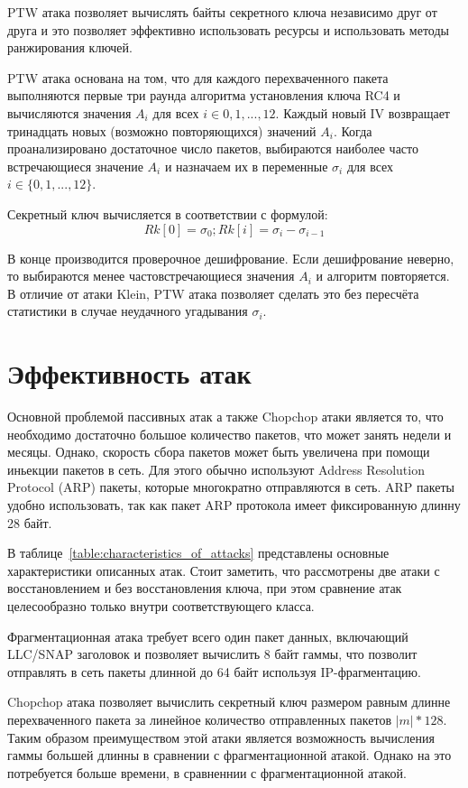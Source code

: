 PTW атака позволяет вычислять байты секретного ключа независимо друг от друга и
это позволяет эффективно использовать ресурсы и использовать методы ранжирования
ключей.

PTW атака основана на том, что для каждого перехваченного пакета выполняются
первые три раунда алгоритма установления ключа RC4 и вычисляются значения $A_i$
для всех $i \in{0, 1, ..., 12}$. Каждый новый IV возвращает тринадцать новых
(возможно повторяющихся) значений $A_i$. Когда проанализировано достаточное
число пакетов, выбираются наиболее часто встречающиеся значение $A_i$ и
назначаем их в переменные $\sigma_i$ для всех $i \in \{0, 1, ..., 12\}$.

Секретный ключ вычисляется в соответствии с формулой:
$$ Rk[0] = \sigma_0; Rk[i] = \sigma_i - \sigma_{i-1}$$

В конце производится проверочное дешифрование. Если дешифрование неверно, то
выбираются менее частовстречающиеся значения $A_i$ и алгоритм повторяется. В
отличие от атаки Klein, PTW атака позволяет сделать это без пересчёта статистики
в случае неудачного угадывания $\sigma_i$.

\section{Эффективность атак}

Основной проблемой пассивных атак а также Chopchop атаки является то, что
необходимо достаточно большое количество пакетов, что может занять недели и
месяцы. Однако, скорость сбора пакетов может быть увеличена при помощи иньекции
пакетов в сеть. Для этого обычно используют Address Resolution Protocol (ARP)
пакеты, которые многократно отправляются в сеть. ARP пакеты удобно использовать,
так как пакет ARP протокола имеет фиксированную длинну 28 байт.

В таблице~\ref{table:characteristics_of_attacks} представлены основные
характеристики описанных атак. Стоит заметить, что рассмотрены две атаки с
восстановлением и без восстановления ключа, при этом сравнение атак
целесообразно только внутри соответствующего класса.

Фрагментационная атака требует всего один пакет данных, включающий LLC/SNAP
заголовок и позволяет вычислить 8 байт гаммы, что позволит отправлять в сеть
пакеты длинной до 64 байт используя IP-фрагментацию.

Chopchop атака позволяет вычислить секретный ключ размером равным длинне
перехваченного пакета за линейное количество отправленных пакетов $|m| * 128$.
Таким образом преимуществом этой атаки является возможность вычисления гаммы
большей длинны в сравнении с фрагментационной атакой. Однако на это потребуется
больше времени, в сравненнии с фрагментационной атакой.

